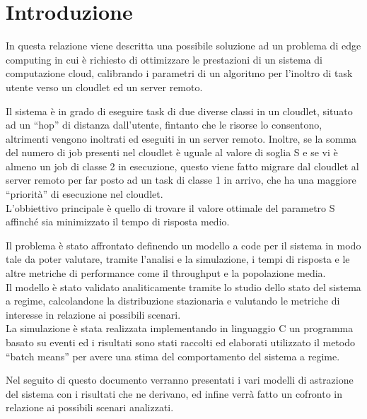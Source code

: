 \section{Introduzione}
In questa relazione viene descritta una possibile soluzione ad un problema di
edge computing in cui è richiesto di ottimizzare le prestazioni di un sistema di
computazione cloud, calibrando i parametri di un algoritmo per l'inoltro di task
utente verso un cloudlet ed un server remoto.

Il sistema è in grado di eseguire task di due diverse classi in un cloudlet,
situato ad un ``hop'' di distanza dall'utente, fintanto che le risorse lo
consentono, altrimenti vengono inoltrati ed eseguiti in un server remoto.
Inoltre, se la somma del numero di job presenti nel cloudlet è uguale al valore
di soglia S e se vi è almeno un job di classe 2 in esecuzione, questo viene
fatto migrare dal cloudlet al server remoto per far posto ad un task di classe 1
in arrivo, che ha una maggiore ``priorità'' di esecuzione nel cloudlet.\\
L'obbiettivo principale è quello di trovare il valore ottimale del parametro S
affinché sia minimizzato il tempo di risposta medio.

Il problema è stato affrontato definendo un modello a code per il sistema in
modo tale da poter valutare, tramite l'analisi e la simulazione, i tempi di
risposta e le altre metriche di performance come il throughput e la popolazione
media.\\ 
Il modello è stato validato analiticamente tramite lo studio dello stato del
sistema a regime, calcolandone la distribuzione stazionaria e valutando le
metriche di interesse in relazione ai possibili scenari.\\ 
La simulazione è stata realizzata implementando in linguaggio C un programma
basato su eventi ed i risultati sono stati raccolti ed elaborati utilizzato il
metodo ``batch means'' per avere una stima del comportamento del sistema a
regime.

Nel seguito di questo documento verranno presentati i vari modelli di
astrazione del sistema con i risultati che ne derivano, ed infine verrà fatto un
cofronto in relazione ai possibili scenari analizzati.
